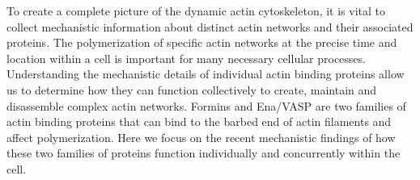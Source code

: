 \abstract
To create a complete picture of the dynamic actin cytoskeleton, it is vital to collect mechanistic information about distinct actin networks and their associated proteins. The polymerization of specific actin networks at the precise time and location within a cell is important for many necessary cellular processes. Understanding the mechanistic details of individual actin binding proteins allow us to determine how they can function collectively to create, maintain and disassemble complex actin networks. Formins and Ena/VASP are two families of actin binding proteins that can bind to the barbed end of actin filaments and affect polymerization. Here we focus on the recent mechanistic findings of how these two families of proteins function individually and concurrently within the cell.

